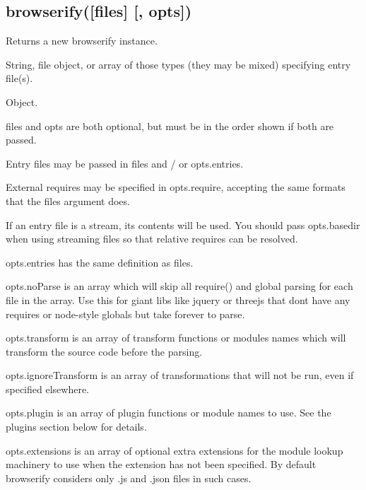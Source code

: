 \subsection*{{\ttfamily browserify(\mbox{[}files\mbox{]} \mbox{[}, opts\mbox{]})}}

Returns a new browserify instance.


\begin{DoxyDescription}
\item[files  ]String, file object, or array of those types (they may be mixed) specifying entry file(s). 


\item[opts  ]Object.  
\end{DoxyDescription}

{\ttfamily files} and {\ttfamily opts} are both optional, but must be in the order shown if both are passed.

Entry files may be passed in {\ttfamily files} and / or {\ttfamily opts.\+entries}.

External requires may be specified in {\ttfamily opts.\+require}, accepting the same formats that the {\ttfamily files} argument does.

If an entry file is a stream, its contents will be used. You should pass {\ttfamily opts.\+basedir} when using streaming files so that relative requires can be resolved.

{\ttfamily opts.\+entries} has the same definition as {\ttfamily files}.

{\ttfamily opts.\+no\+Parse} is an array which will skip all require() and global parsing for each file in the array. Use this for giant libs like jquery or threejs that don\textquotesingle{}t have any requires or node-\/style globals but take forever to parse.

{\ttfamily opts.\+transform} is an array of transform functions or modules names which will transform the source code before the parsing.

{\ttfamily opts.\+ignore\+Transform} is an array of transformations that will not be run, even if specified elsewhere.

{\ttfamily opts.\+plugin} is an array of plugin functions or module names to use. See the plugins section below for details.

{\ttfamily opts.\+extensions} is an array of optional extra extensions for the module lookup machinery to use when the extension has not been specified. By default browserify considers only {\ttfamily .js} and {\ttfamily .json} files in such cases.

